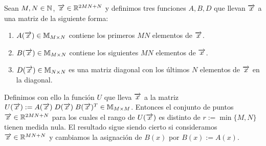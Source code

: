 \begin{lema} \label{lema:primer_lema}

    Sean $M, N \in \mathbb{N}$, $\overrightarrow{x} \in \mathbb{R}^{2MN + N}$ y definimos tres funciones $A, B, D$ que llevan $\overrightarrow{x}$ a una matriz de la siguiente forma:

    \begin{enumerate}
        \item $A(\overrightarrow{x}) \in \mathbb{M}_{M \times N}$ contiene los primeros $MN$ elementos de $\overrightarrow{x}$.
        \item $B(\overrightarrow{x}) \in \mathbb{M}_{M \times N}$ contiene los siguientes $MN$ elementos de $\overrightarrow{x}$.
        \item $D(\overrightarrow{x}) \in \mathbb{M}_{N \times N}$ es una matriz diagonal con los últimos $N$ elementos de $\overrightarrow{x}$ en la diagonal.
    \end{enumerate}

    Definimos con ello la función $U$ que lleva $\overrightarrow{x}$ a la matriz $U(\overrightarrow{x}) := A(\overrightarrow{x}) \; D(\overrightarrow{x}) \; B(\overrightarrow{x})^T \in \mathbb{M}_{M \times M}$. Entonces el conjunto de puntos $\overrightarrow{x} \in \mathbb{R}^{2MN + N}$ para los cuales el rango de $U(\overrightarrow{x})$ es distinto de $r := \min \{M, N\}$ tienen medida nula. El resultado sigue siendo cierto si consideramos $\overrightarrow{x} \in \mathbb{R}^{MN+N}$ y cambiamos la asignación de $B(x)$ por $B(x) := A(x)$.
\end{lema}

